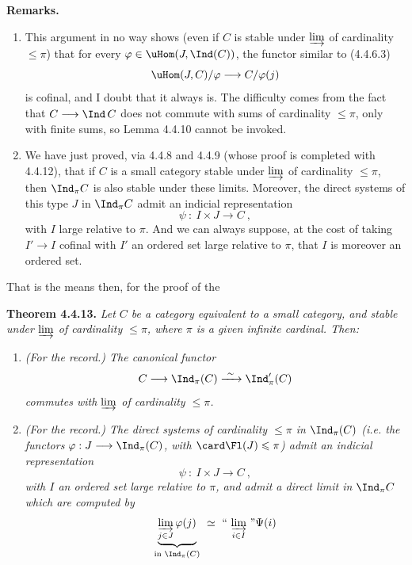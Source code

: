 \textbf{Remarks.}
\begin{enumerate}[label={}, leftmargin=*]
\item[1.] This argument in no way shows (even if $C$ is stable under $\varinjlim$ of cardinality $\leqslant \pi$) that for every $\varphi \in \uHom(J,\Ind(C))$, the functor similar to (4.4.6.3)
\[
\uHom(J,C)/\varphi \longrightarrow C/\varphi(j)
\]
is cofinal, and I doubt that it always is. The difficulty comes from the fact that $C \longrightarrow \Ind\, C$ does not commute with sums of cardinality $\leqslant \pi$, only with finite sums,
so Lemma 4.4.10 cannot be invoked.
\item[2.] We have just proved, via 4.4.8 and 4.4.9 (whose proof is completed with 4.4.12), that if $C$ is a small category stable under $\varinjlim$ of cardinality $\leqslant \pi$, then $\Ind_\pi C$ is also stable under these limits. Moreover, the direct systems of this type $J$ in $\Ind_\pi C$ admit an indicial representation
\[
\psi \ :\ I \times J \longrightarrow C\ ,
\]
with $I$ large relative to $\pi$. And we can always suppose, at the cost of taking $I' \longrightarrow I$ cofinal with $I'$ an ordered set large relative to $\pi$, that $I$ is moreover an ordered set.
\end{enumerate}

That is the means then, for the proof of the

\textbf{Theorem 4.4.13.} \textit{Let $C$ be a category equivalent to a small category, and stable under $\varinjlim$ of cardinality $\leqslant \pi$, where $\pi$ is a given infinite cardinal. Then:}

\begin{enumerate}[label={}, leftmargin=*]
\item[\textit{a)}] \textit{(For the record.) The canonical functor}
\[
C \longrightarrow \Ind_\pi(C) \xrightarrow{\ \sim\ } \Ind'_\pi(C)
\]
\textit{commutes with $\varinjlim$ of cardinality $\leqslant \pi$.}
\item[\textit{b)}] \textit{(For the record.) The direct systems of cardinality $\leqslant \pi$ in $\Ind_\pi(C)$ (i.e. the functors $\varphi : J \longrightarrow \Ind_\pi(C)$, with $\card \Fl(J) \leqslant \pi$) admit an indicial representation}
\[
\psi \ :\ I \times J \longrightarrow C\ ,
\]
\textit{with $I$ an ordered set large relative to $\pi$, and admit a direct limit in $\Ind_\pi C$ which are computed by}
\[
\underbrace{\varinjlim_{j\in J} \varphi(j)}_{\text{in } \Ind_\pi(C)} \ \simeq\ \text{``}\,\varinjlim_{i\in I}\,\text{''}\Psi(i)
\]
\end{enumerate}
